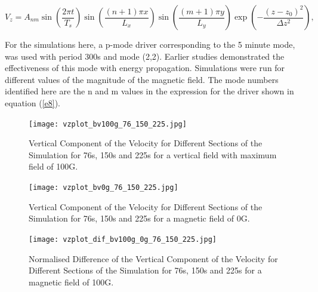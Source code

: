 \documentclass[linenumbers]{aastex63}
\begin{document}
\begin{equation}
 V_{z}  =  A_{nm} \sin\left(\frac{2\pi t}{T_s} \right)\sin\left(  \frac{(n+1)\pi x}{L_x} \right)  
 \sin\left(\frac{(m+1)\pi y}{L_y} \right) \exp\left( -\frac{(z-z_0)^2}{\Delta z^2} \right),
\label{e8}
\end{equation}

For the  simulations here, a p-mode driver corresponding to the 5 minute mode, was used with period 300s and mode (2,2). Earlier studies demonstrated the effectiveness of this mode with energy propagation. Simulations were run for different values of the magnitude of the magnetic field. The mode numbers identified here are the n and m values in the expression for the driver shown in equation (\ref{e8}).


\begin{figure}\label{vzplot_bv100g_76_150_225}
\texttt{[image: vzplot\_bv100g\_76\_150\_225.jpg]}
\caption{Vertical Component of the Velocity for Different Sections of the Simulation for 76s, 150s and 225s for a vertical field with maximum field of 100G.}
\end{figure}



\begin{figure}\label{vzplot_bv0g_76_150_225}
\texttt{[image: vzplot\_bv0g\_76\_150\_225.jpg]}
\caption{Vertical Component of the Velocity for Different Sections of the Simulation for 76s, 150s and 225s for a magnetic field of 0G.}
\end{figure}



\begin{figure}\label{vzplot_bv100g_0g_76_150_225}
\texttt{[image: vzplot\_dif\_bv100g\_0g\_76\_150\_225.jpg]}
\caption{Normalised Difference of the Vertical Component of the Velocity for Different Sections of the Simulation for 76s, 150s and 225s for a magnetic field of 100G.}
\end{figure}
\end{document}
